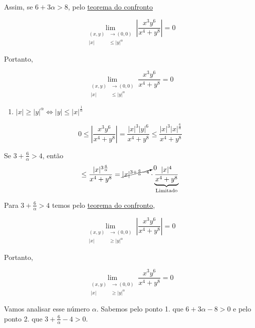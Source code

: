 \documentclass[
  portuguese,
  letterpaper,
  DIV=11,
  numbers=noendperiod]{scrreport}
\providecommand{\tightlist}{%
  \setlength{\itemsep}{0pt}\setlength{\parskip}{0pt}}
\begin{document}
Assim, se \(6+3\alpha > 8\), pelo \hyperref[sec-confronto]{teorema do
confronto}

\[
\lim_{\begin{aligned}(x,y)&\rightarrow (0,0) 
\\ \lvert x \rvert &\leq \lvert y \rvert^{\alpha} \end{aligned}} 
\left\lvert \frac{x^3 y^6}{x^4+y^8} \right\rvert = 0 
\]

Portanto,

\[
\lim_{\begin{aligned}(x,y)&\rightarrow (0,0) 
\\ \lvert x \rvert &\leq \lvert y \rvert^{\alpha} \end{aligned}} 
\frac{x^3 y^6}{x^4+y^8} = 0
\]

\begin{enumerate}
\def\labelenumi{\arabic{enumi}.}
\setcounter{enumi}{1}
\tightlist
\item
  \(\lvert x \rvert \geq \lvert y \rvert^{\alpha} \Leftrightarrow \lvert y \rvert \leq \lvert x \rvert^{\frac{1}{\alpha}}\)
\end{enumerate}

\[
0 \leq \left\lvert \frac{x^3y^6}{x^4+y^8} \right\rvert = 
\frac{\lvert x \rvert^3 \lvert y \rvert^6}{x^4+y^8} \leq
\frac{\lvert x \rvert^3 \lvert x \rvert^{\frac{6}{\alpha}}}{x^4+y^8}
\]

Se \(3 + \frac{6}{\alpha} > 4\), então \[
\leq \frac{\lvert x \rvert^{3 \frac{6}{\alpha}}}{x^4+y^8} =
\cancelto{0}{\lvert x \rvert^{3 + \frac{6}{\alpha} - 4}} \cdot
\underbrace{\frac{\lvert x \rvert^4}{x^4+y^8}}_{\text{Limitado}}
\]

Para \(3 + \frac{6}{\alpha} > 4\) temos pelo
\href{limites.qmd$sec-confronto}{teorema do confronto},

\[
\lim_{\begin{aligned}(x,y)&\rightarrow (0,0) \\ 
\lvert x \rvert & \geq \lvert y \rvert^{\alpha} \end{aligned}}
\left\lvert \frac{x^3y^6}{x^4+y^8} \right\rvert = 0
\]

Portanto,

\[
\lim_{\begin{aligned}(x,y)&\rightarrow (0,0) \\ 
\lvert x \rvert & \geq \lvert y \rvert^{\alpha} \end{aligned}}
\frac{x^3y^6}{x^4+y^8}  = 0
\]

Vamos analisar esse número \(\alpha\). Sabemos pelo ponto 1. que
\(6 + 3\alpha - 8 >0\) e pelo ponto 2. que
\(3 + \frac{6}{\alpha} - 4 >0\).
\end{document}
